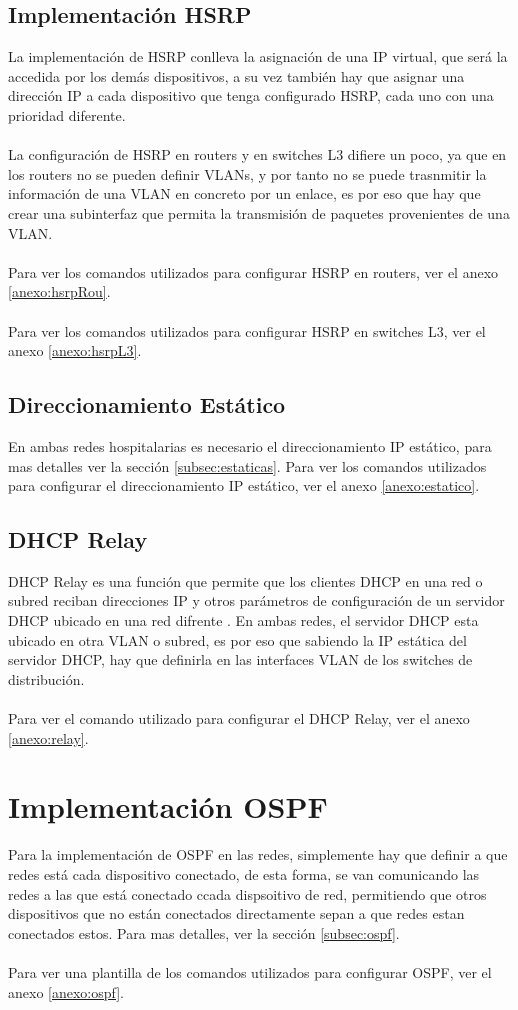 \subsection{Implementación HSRP}
La implementación de HSRP conlleva la asignación de una IP virtual, que será la accedida por los demás dispositivos, a su vez también hay que asignar una dirección IP a cada dispositivo que tenga configurado HSRP, cada uno con una prioridad diferente.
\\ \\
La configuración de HSRP en routers y en switches L3 difiere un poco, ya que en los routers no se pueden definir VLANs, y por tanto no se puede trasnmitir la información de una VLAN en concreto por un enlace, es por eso que hay que crear una subinterfaz que permita la transmisión de paquetes provenientes de una VLAN.
\\ \\
Para ver los comandos utilizados para configurar HSRP en routers, ver el anexo \ref{anexo:hsrpRou}.
\\ \\
Para ver los comandos utilizados para configurar HSRP en switches L3, ver el anexo \ref{anexo:hsrpL3}.
\subsection{Direccionamiento Estático}
En ambas redes hospitalarias es necesario el direccionamiento IP estático, para mas detalles ver la sección \ref{subsec:estaticas}. Para ver los comandos utilizados para configurar el direccionamiento IP estático, ver el anexo \ref{anexo:estatico}.
\subsection{DHCP Relay}
DHCP Relay es una función que permite que los clientes DHCP en una red o subred reciban direcciones IP y otros parámetros de configuración de un servidor DHCP ubicado en una red difrente \cite{cisco_dhcp_relay}. En ambas redes, el servidor DHCP esta ubicado en otra VLAN o subred, es por eso que sabiendo la IP estática del servidor DHCP, hay que definirla en las interfaces VLAN de los switches de distribución. 
\\ \\
Para ver el comando utilizado para configurar el DHCP Relay, ver el anexo \ref{anexo:relay}.
\section{Implementación OSPF}
Para la implementación de OSPF en las redes, simplemente hay que definir a que redes está cada dispositivo conectado, de esta forma, se van comunicando las redes a las que está conectado ccada dispsoitivo de red, permitiendo que otros dispositivos que no están conectados directamente sepan a que redes estan conectados estos. Para mas detalles, ver la sección \ref{subsec:ospf}.
\\ \\
Para ver una plantilla de los comandos utilizados para configurar OSPF, ver el anexo \ref{anexo:ospf}.
